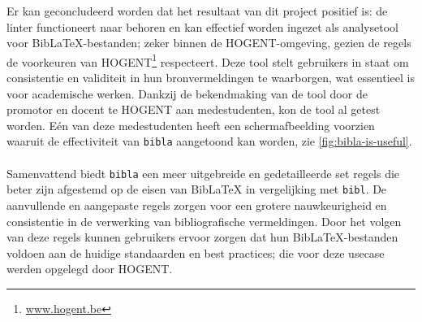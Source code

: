 Er kan geconcludeerd worden dat het resultaat van dit project  positief is: de linter functioneert naar behoren en kan effectief worden ingezet als analysetool voor BibLaTeX-bestanden; zeker binnen de HOGENT-omgeving, gezien de regels de voorkeuren van HOGENT\footnote{\url{www.hogent.be}} respecteert. Deze tool stelt gebruikers in staat om consistentie en validiteit in hun bronvermeldingen te waarborgen, wat essentieel is voor academische werken. Dankzij de bekendmaking van de tool door de promotor en docent te HOGENT aan medestudenten, kon de tool al getest worden. Eén van deze medestudenten heeft een schermafbeelding voorzien waaruit de effectiviteit van \texttt{bibla} aangetoond kan worden, zie \ref{fig:bibla-is-useful}.
\\
\\
Samenvattend biedt \texttt{bibla} een meer uitgebreide en gedetailleerde set regels die beter zijn afgestemd op de eisen van BibLaTeX in vergelijking met \texttt{bibl}. De aanvullende en aangepaste regels zorgen voor een grotere nauwkeurigheid en consistentie in de verwerking van bibliografische vermeldingen. Door het volgen van deze regels kunnen gebruikers ervoor zorgen dat hun BibLaTeX-bestanden voldoen aan de huidige standaarden en best practices; die voor deze usecase werden opgelegd door HOGENT.

